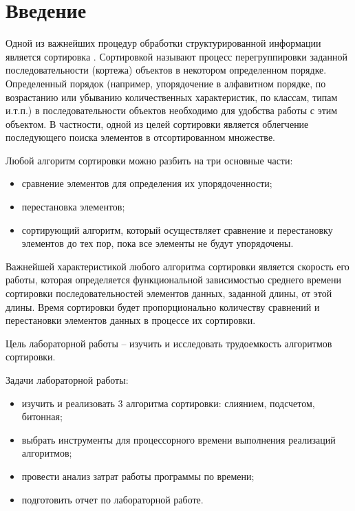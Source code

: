 \chapter*{Введение}

Одной из важнейших процедур обработки структурированной информации является сортировка \cite{Knut}. Сортировкой называют процесс перегруппировки заданной последовательности (кортежа) объектов в некотором определенном порядке. Определенный порядок (например, упорядочение в алфавитном порядке, по возрастанию или убыванию количественных характеристик, по классам, типам и.т.п.) в последовательности объектов необходимо для удобства работы с этим объектом. В частности, одной из целей сортировки является облегчение последующего поиска элементов в отсортированном множестве. 

Любой алгоритм сортировки можно разбить на три основные части:
\begin{itemize}
	\item сравнение элементов для определения их упорядоченности;
	\item перестановка элементов;
	\item сортирующий алгоритм, который осуществляет сравнение и перестановку элементов до тех пор, пока все элементы не будут упорядочены.
\end{itemize}

Важнейшей характеристикой любого алгоритма сортировки является скорость его работы, которая определяется функциональной зависимостью среднего времени сортировки последовательностей элементов данных, заданной длины, от этой длины. Время сортировки будет пропорционально количеству сравнений и перестановки элементов данных в процессе их сортировки.

Цель лабораторной работы -- изучить и исследовать трудоемкость алгоритмов сортировки.

Задачи лабораторной работы:
\begin{itemize}
	\item изучить и реализовать 3 алгоритма сортировки: слиянием, подсчетом, битонная;
	\item выбрать инструменты для процессорного времени выполнения реализаций алгоритмов;
	\item провести анализ затрат работы программы по времени;
	\item подготовить отчет по лабораторной работе.
\end{itemize}
